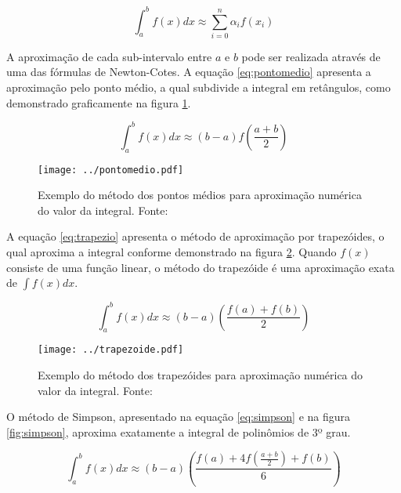 \begin{equation}\label{eq:quadratura}
  \int_a^b f(x)dx \approx \sum_{i=0}^n \alpha_i f(x_i)
\end{equation}

A aproximação de cada sub-intervalo entre \(a\) e \(b\) pode ser realizada através de uma das fórmulas de Newton-Cotes. A equação \eqref{eq:pontomedio} apresenta a aproximação pelo ponto médio, a qual subdivide a integral em retângulos, como demonstrado graficamente na figura \ref{fig:pontomedio}.

\begin{equation}\label{eq:pontomedio}
  \int_a^b f(x)dx \approx (b-a) f\left( \frac{a+b}{2} \right)
\end{equation}

\begin{figure}
  \centering
  \texttt{[image: ../pontomedio.pdf]}
  \caption[Exemplo do método dos pontos médios para aproximação numérica do valor da integral.]{Exemplo do método dos pontos médios para aproximação numérica do valor da integral. Fonte: \protect\cite{wiki:numeint}}
  \label{fig:pontomedio}
\end{figure}

A equação \eqref{eq:trapezio} apresenta o método de aproximação por trapezóides, o qual aproxima a integral conforme demonstrado na figura \ref{fig:trapezoide}. Quando \(f(x)\) consiste de uma função linear, o método do trapezóide é uma aproximação exata de \(\int f(x)dx\).

\begin{equation}\label{eq:trapezio}
  \int_a^b f(x)dx \approx (b-a) \left( \frac{f(a)+f(b)}{2} \right)
\end{equation}

\begin{figure}
  \centering
  \texttt{[image: ../trapezoide.pdf]}
  \caption[Exemplo do método dos trapezóides para aproximação numérica do valor da integral.]{Exemplo do método dos trapezóides para aproximação numérica do valor da integral. Fonte: \protect\cite{wiki:numeint}}
  \label{fig:trapezoide}
\end{figure}

O método de Simpson, apresentado na equação \eqref{eq:simpson} e na figura \ref{fig:simpson}, aproxima exatamente a integral de polinômios de 3º grau.

\begin{equation}\label{eq:simpson}
  \int_a^b f(x)dx \approx (b-a) \left( \frac{f(a) + 4f\left( \frac{a+b}{2} \right) + f(b)}{6} \right)
\end{equation}

